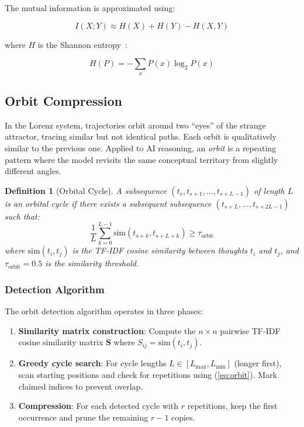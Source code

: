 \documentclass[journal,10pt]{IEEEtran}
\newtheorem{definition}{Definition}
\begin{document}
The mutual information is approximated using:

\begin{equation}
I(X; Y) \approx H(X) + H(Y) - H(X, Y)
\label{eq:mi}
\end{equation}

\noindent where $H$ is the Shannon entropy~\cite{shannon1948}:

\begin{equation}
H(P) = -\sum_{x} P(x) \log_2 P(x)
\label{eq:entropy}
\end{equation}

\subsection{Orbit Compression}
\label{sec:orbit}

In the Lorenz system, trajectories orbit around two ``eyes'' of the strange attractor, tracing similar but not identical paths. Each orbit is qualitatively similar to the previous one. Applied to AI reasoning, an \emph{orbit} is a repeating pattern where the model revisits the same conceptual territory from slightly different angles.

\begin{definition}[Orbital Cycle]
\label{def:orbit}
A subsequence $(t_{s}, t_{s+1}, \ldots, t_{s+L-1})$ of length $L$ is an \emph{orbital cycle} if there exists a subsequent subsequence $(t_{s+L}, \ldots, t_{s+2L-1})$ such that:
\begin{equation}
\frac{1}{L} \sum_{k=0}^{L-1} \text{sim}(t_{s+k}, t_{s+L+k}) \geq \tau_{\text{orbit}}
\label{eq:orbit}
\end{equation}
where $\text{sim}(t_i, t_j)$ is the TF-IDF cosine similarity between thoughts $t_i$ and $t_j$, and $\tau_{\text{orbit}} = 0.5$ is the similarity threshold.
\end{definition}

\subsubsection{Detection Algorithm}

The orbit detection algorithm operates in three phases:

\begin{enumerate}[nosep]
\item \textbf{Similarity matrix construction}: Compute the $n \times n$ pairwise TF-IDF cosine similarity matrix $\mathbf{S}$ where $S_{ij} = \text{sim}(t_i, t_j)$.
\item \textbf{Greedy cycle search}: For cycle lengths $L \in [L_{\max}, L_{\min}]$ (longer first), scan starting positions and check for repetitions using (\ref{eq:orbit}). Mark claimed indices to prevent overlap.
\item \textbf{Compression}: For each detected cycle with $r$ repetitions, keep the first occurrence and prune the remaining $r-1$ copies.
\end{enumerate}
\end{document}
